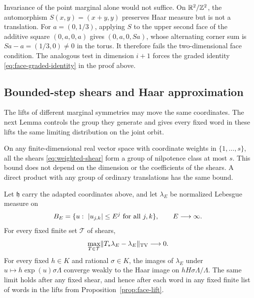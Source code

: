 \begin{remark}
Invariance of the point marginal alone would not suffice.  On
$\mathbb R^2/\mathbb Z^2$, the automorphism $S(x,y)=(x+y,y)$ preserves Haar measure
but is not a translation.  For $a=(0,1/3)$, applying $S$ to the upper
second face of the additive square $(0,a,0,a)$ gives $(0,a,0,Sa)$,
whose alternating corner sum is $Sa-a=(1/3,0)\ne0$ in the torus.
It therefore fails the two-dimensional face condition.  The analogous
test in dimension $i+1$ forces the graded identity
\eqref{eq:face-graded-identity} in the proof above.
\end{remark}

\subsection{Bounded-step shears and Haar approximation}

The lifts of different marginal symmetries may move the same coordinates.
The next Lemma controls the group they generate and gives every fixed
word in these lifts the same limiting distribution on the joint orbit.

\begin{lemma}
\label{lem:shear-haar}
On any finite-dimensional real vector space with coordinate weights in
$\{1,\ldots,s\}$, all the shears \eqref{eq:weighted-shear} form a group
of nilpotence class at most $s$.  This bound does not depend on the
dimension or the coefficients of the shears.  A direct product with any
group of ordinary translations has the same bound.

Let $\mathfrak h$ carry the adapted coordinates above, and let $\lambda_E$
be normalized Lebesgue measure on
\begin{equation}
 B_E=\{u:\ \abs{u_{j,k}}\leq E^j\text{ for all }j,k\},
 \qquad E\longrightarrow\infty.
 \label{eq:weighted-haar-boxes}
\end{equation}
For every fixed finite set $\mathcal T$ of shears,
\begin{equation}
 \max_{T\in\mathcal T}
   \lVert T_*\lambda_E-\lambda_E\rVert_{\operatorname{TV}}\longrightarrow0.
 \label{eq:fixed-shear-tv}
\end{equation}
For every fixed $h\in K$ and rational $\sigma\in K$, the images of
$\lambda_E$ under $u\mapsto h\exp(u)\sigma\Lambda$ converge weakly to
the Haar image on $hH\sigma\Lambda/\Lambda$.  The same limit holds
after any fixed shear, and hence after each word in any fixed finite
list of words in the lifts from Proposition~\ref{prop:face-lift}.
\end{lemma}

